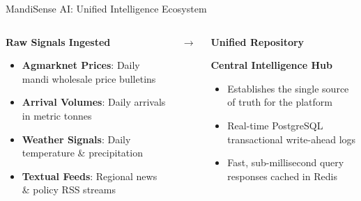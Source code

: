 \documentclass{beamer}
\begin{document}
\begin{frame}{MandiSense AI: Unified Intelligence Ecosystem}
\vspace{-0.1cm}

\begin{columns}[T]
    \begin{smallcard}[0.98\textwidth]
        \centering
        \textbf{\textcolor{primaryDark}{Raw Signals Ingested}}
        \vspace{0.1cm}
        \begin{itemize}
            \tiny
            \item \textbf{Agmarknet Prices}: Daily mandi wholesale price bulletins
            \item \textbf{Arrival Volumes}: Daily arrivals in metric tonnes
            \item \textbf{Weather Signals}: Daily temperature \& precipitation
            \item \textbf{Textual Feeds}: Regional news \& policy RSS streams
        \end{itemize}
    \end{smallcard}

    \centering \vspace{1.2cm} \textcolor{primaryLight}{\scriptsize $\rightarrow$}

    \begin{smallcard}[0.98\textwidth]
        \centering
        \textbf{\textcolor{accentTeal}{Unified Repository}}
        \vspace{0.15cm}
        \centering
        \begin{minipage}{0.9\textwidth}
            \centering \scriptsize
            \textbf{\textcolor{primaryDark}{Central Intelligence Hub}}
            \vspace{0.1cm}
            \begin{itemize}
                \tiny
                \item Establishes the single source of truth for the platform
                \item Real-time PostgreSQL transactional write-ahead logs
                \item Fast, sub-millisecond query responses cached in Redis
            \end{itemize}
        \end{minipage}
    \end{smallcard}


\end{columns}
\end{frame}
\end{document}
